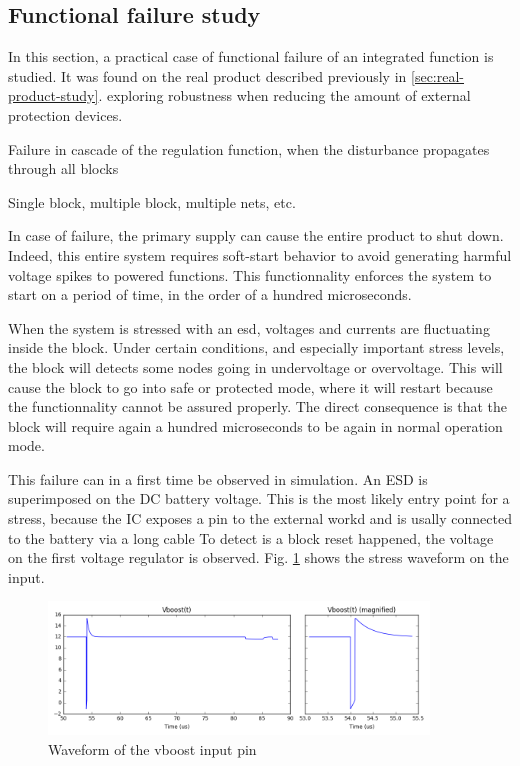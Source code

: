 \subsection{Functional failure study}
\label{sec:failure-case-study}

In this section, a practical case of functional failure of an integrated function is studied.
It was found on the real product described previously in \ref{sec:real-product-study}.
exploring robustness when reducing the amount of external protection devices.

Failure in cascade of the regulation function, when the disturbance propagates through all blocks

Single block, multiple block, multiple nets, etc.

In case of failure, the primary supply can cause the entire product to shut down.
Indeed, this entire system requires soft-start behavior to avoid generating harmful voltage spikes to powered functions.
This functionnality enforces the system to start on a  period of time, in the order of a hundred microseconds.

When the system is stressed with an \gls{esd}, voltages and currents are fluctuating inside the block.
Under certain conditions, and especially important stress levels, the block will detects some nodes going in undervoltage or overvoltage.
This will cause the block to go into safe or protected mode, where it will restart because the functionnality cannot be assured properly.
The direct consequence is that the block will require again a hundred microseconds to be again in normal operation mode.

This failure can in a first time be observed in simulation.
An \gls{ESD} is superimposed on the DC battery voltage.
This is the most likely entry point for a stress, because the \gls{IC} exposes a pin to the external workd and is usally connected to the battery via a long cable
To detect is a block reset happened, the voltage on the first voltage regulator is observed.
Fig. \ref{fig:wvf-vboost} shows the stress waveform on the input.

\begin{figure}[!htbp]
  \centering
  \includegraphics[width=0.9\textwidth]{src/3/figures/vboost.png}
  \caption{Waveform of the vboost input pin}
  \label{fig:wvf-vboost}
\end{figure}

